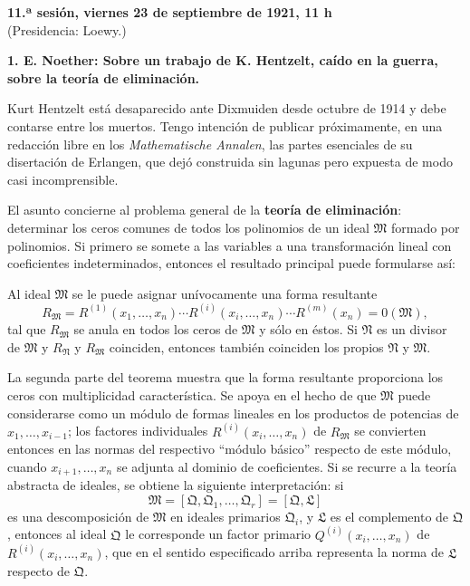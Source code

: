 \documentclass[11pt]{article}
\begin{document}
\begin{center}
\textbf{11.ª sesión, viernes 23 de septiembre de 1921, 11 h}\\
(Presidencia: Loewy.)
\end{center}

\textbf{1. E. Noether: Sobre un trabajo de K. Hentzelt, caído en la guerra, sobre la teoría de eliminación.}

Kurt Hentzelt está desaparecido ante Dixmuiden desde octubre de 1914 y debe contarse entre los muertos. Tengo intención de publicar próximamente, en una redacción libre en los \emph{Mathematische Annalen}, las partes esenciales de su disertación de Erlangen, que dejó construida sin lagunas pero expuesta de modo casi incomprensible.

El asunto concierne al problema general de la \textbf{teoría de eliminación}: determinar los ceros comunes de todos los polinomios de un ideal $\mathfrak M$ formado por polinomios. Si primero se somete a las variables a una transformación lineal con coeficientes indeterminados, entonces el resultado principal puede formularse así:

Al ideal $\mathfrak M$ se le puede asignar unívocamente una forma resultante
\[
 R_{\mathfrak M}=R^{(1)}(x_1,
\ldots,x_n)\cdots R^{(i)}(x_i,
\ldots,x_n)\cdots R^{(m)}(x_n)=0(\mathfrak M),
\]
tal que $R_{\mathfrak M}$ se anula en todos los ceros de $\mathfrak M$ y sólo en éstos. Si $\mathfrak N$ es un divisor de $\mathfrak M$ y $R_{\mathfrak N}$ y $R_{\mathfrak M}$ coinciden, entonces también coinciden los propios $\mathfrak N$ y $\mathfrak M$.

La segunda parte del teorema muestra que la forma resultante proporciona los ceros con multiplicidad característica. Se apoya en el hecho de que $\mathfrak M$ puede considerarse como un módulo de formas lineales en los productos de potencias de $x_1,\ldots,x_{i-1}$; los factores individuales $R^{(i)}(x_i,\ldots,x_n)$ de $R_{\mathfrak M}$ se convierten entonces en las normas del respectivo ``módulo básico'' respecto de este módulo, cuando $x_{i+1},\ldots,x_n$ se adjunta al dominio de coeficientes. Si se recurre a la teoría abstracta de ideales, se obtiene la siguiente interpretación: si
\[
 \mathfrak M=[\mathfrak Q,\mathfrak Q_1,
\ldots,
\mathfrak Q_r]=[\mathfrak Q,\mathfrak L]
\]
es una descomposición de $\mathfrak M$ en ideales primarios $\mathfrak Q_i$, y $\mathfrak L$ es el complemento de $\mathfrak Q$, entonces al ideal $\mathfrak Q$ le corresponde un factor primario $Q^{(i)}(x_i,\ldots,x_n)$ de $R^{(i)}(x_i,\ldots,x_n)$, que en el sentido especificado arriba representa la norma de $\mathfrak L$ respecto de $\mathfrak Q$.
\end{document}
